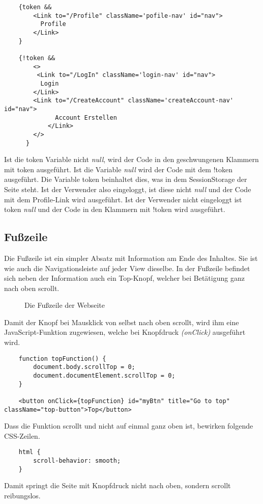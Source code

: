 \begin{lstlisting}
    {token && 
        <Link to="/Profile" className='pofile-nav' id="nav">
          Profile
        </Link>
    }

    {!token &&
        <>
         <Link to="/LogIn" className='login-nav' id="nav">
          Login
        </Link>
        <Link to="/CreateAccount" className='createAccount-nav' id="nav">
              Account Erstellen
            </Link>
        </>
      }
\end{lstlisting}

Ist die token Variable nicht \textit{null}, wird der Code in den geschwungenen Klammern 
mit token ausgeführt. Ist die Variable \textit{null} wird der Code mit dem !token ausgeführt. 
Die Variable token beinhaltet dies, was in dem SessionStorage der Seite steht. Ist der Verwender also eingeloggt, ist diese 
nicht \textit{null} und der Code mit dem Profile-Link wird ausgeführt. Ist der Verwender nicht eingeloggt ist token 
\textit{null} und der Code in den Klammern mit !token wird ausgeführt.

\subsection{Fußzeile}
\label{footer}

Die Fußzeile ist ein simpler Absatz mit Information am Ende des Inhaltes.
Sie ist wie auch die Navigationsleiste auf jeder View dieselbe. In der Fußzeile befindet sich neben 
der Information auch ein Top-Knopf, welcher bei Betätigung ganz nach oben scrollt. 

\begin{figure}[H]
    \begin{center}
      \caption{Die Fußzeile der Webseite}
    \end{center}
\end{figure}

\pagebreak

Damit der Knopf bei Mausklick von selbst nach oben scrollt, wird ihm eine JavaScript-Funktion 
zugewiesen, welche bei Knopfdruck \textit{(onClick)} ausgeführt wird.

\begin{lstlisting}
    function topFunction() {
        document.body.scrollTop = 0;
        document.documentElement.scrollTop = 0;
    }

    <button onClick={topFunction} id="myBtn" title="Go to top" className="top-button">Top</button>
\end{lstlisting}

Dass die Funktion scrollt und nicht auf einmal ganz oben ist, bewirken folgende CSS-Zeilen.

\begin{lstlisting}
    html {
        scroll-behavior: smooth;
    }
\end{lstlisting}

Damit springt die Seite mit Knopfdruck nicht nach oben, sondern scrollt reibungslos.